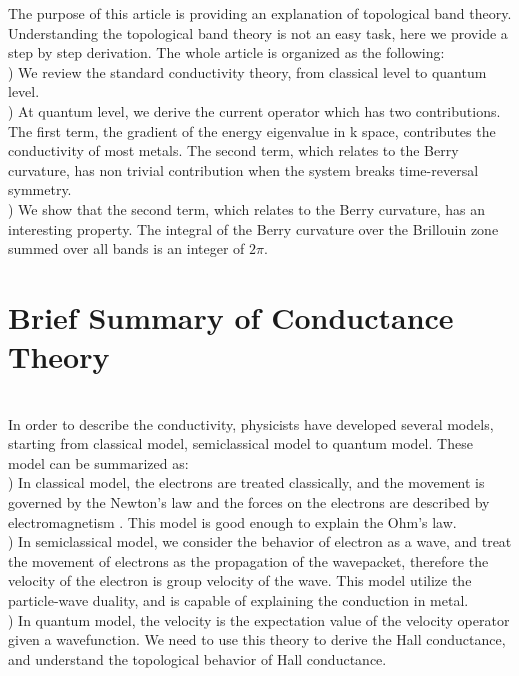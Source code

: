 \documentclass[a4paper]{article}
\begin{document}
\noindent The purpose of this article is providing an explanation of topological band theory. Understanding the topological band theory is not an easy task, here we provide a step by step derivation. The whole article is organized as the following:\\
) We review the standard conductivity theory, from classical level to quantum level.\\
) At quantum level, we derive the current operator which has two contributions. The first term, the gradient of the energy eigenvalue in k space, contributes the conductivity of most metals. The second term, which relates to the Berry curvature, has non trivial contribution when the system breaks time-reversal symmetry.\\
) We show that the second term, which relates to the Berry curvature, has an interesting property. The integral of the Berry curvature over the Brillouin zone summed over all bands is an integer of $2\pi$.\\

\section{Brief Summary of Conductance Theory}\\
\noindent In order to describe the conductivity, physicists have developed several models, starting from classical model, semiclassical model to quantum model. These model can be summarized as:\\
) In classical model, the electrons are treated classically, and the movement is governed by the Newton's law and the forces on the electrons are described by electromagnetism . This model is good enough to explain the Ohm's law.\\
) In semiclassical model, we consider the behavior of electron as a wave, and treat the movement of electrons as the propagation of the wavepacket, therefore the velocity of the electron is group velocity of the wave. This model utilize the particle-wave duality, and is capable of explaining the conduction in metal.\\
) In quantum model, the velocity is the expectation value of the velocity operator given a wavefunction. We need to use this theory to derive the Hall conductance, and understand the topological behavior of Hall conductance.\\
\end{document}
